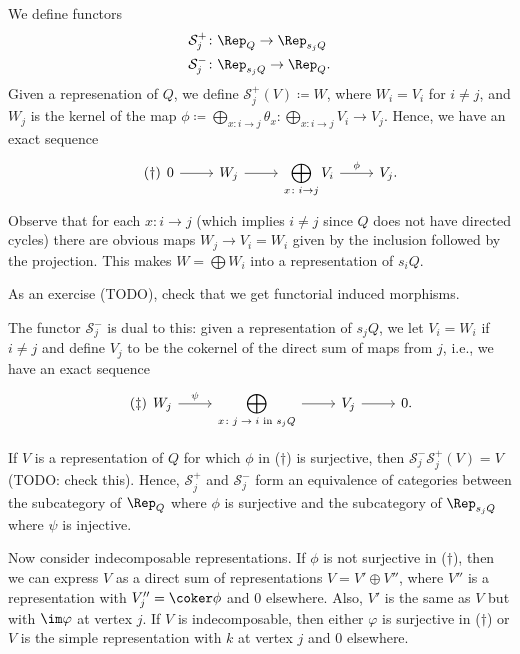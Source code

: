 We define functors
\begin{align*}
	\mathcal{S}^+_j &\colon \Rep_Q \to \Rep_{s_jQ}\\
	\mathcal{S}^-_j &\colon \Rep_{s_jQ}\to \Rep_Q.
\end{align*}
Given a represenation of $Q$, we define $\mathcal{S}_j^+(V)\coloneqq W$, where
$W_i = V_i$ for $i\neq j$, and $W_j$ is the kernel of the map
$\phi\coloneqq \bigoplus_{x\colon i\to j}\theta_x\colon \bigoplus_{x\colon i\to j} V_i \to V_j$.
Hence, we have an exact sequence
\begin{equation}\tag{$\dagger$}
	\begin{tikzcd}
		0\ar[r] & W_j\ar[r] & \displaystyle\bigoplus_{x\colon i\to j} V_i\ar[r, "\phi"] & V_j.
	\end{tikzcd}
\end{equation}
Observe that for each $x\colon i\to j$ (which implies $i\neq j$ since $Q$ does
not have directed cycles)
there are obvious maps $W_j \to V_i = W_i$ given by the inclusion followed
by the projection. This makes $W = \bigoplus W_i$ into a representation
of $s_iQ$.

As an exercise (TODO), check that we get functorial induced morphisms.

The functor $\mathcal{S}_j^-$ is dual to this: given a representation of $s_jQ$,
we let $V_i = W_i$ if $i\neq j$ and define $V_j$ to be the cokernel of the direct
sum of maps from $j$, i.e., we have an exact sequence
\begin{equation}\tag{$\ddagger$}
	\begin{tikzcd}
		W_j \ar[r, "\psi"] & \displaystyle\bigoplus_{\text{$x\colon j\to i$ in $s_jQ$}}\ar[r] & V_j\ar[r] & 0.
	\end{tikzcd}
\end{equation}

If $V$ is a representation of $Q$ for which $\phi$ in  ($\dagger$) is surjective, then
$\mathcal{S}_j^-\mathcal{S}_j^+(V) = V$ (TODO: check this). Hence,
$\mathcal{S}_j^+$ and $\mathcal{S}_j^-$ form an equivalence of categories between
the subcategory of $\Rep_Q$ where $\phi$ is surjective and the subcategory of
$\Rep_{s_jQ}$ where $\psi$ is injective.

Now consider indecomposable representations. If $\phi$ is not surjective in
($\dagger$), then we can express $V$ as a direct sum of representations
$V = V'\oplus V''$, where $V''$ is a representation with  $V''_j = \coker \phi$
and $0$ elsewhere. Also, $V'$ is the same as $V$ but with $\im \varphi$
at vertex $j$. If $V$ is indecomposable, then either $\varphi$ is surjective
in ($\dagger$) or $V$ is the simple representation with $k$ at vertex $j$ and
$0$ elsewhere.
